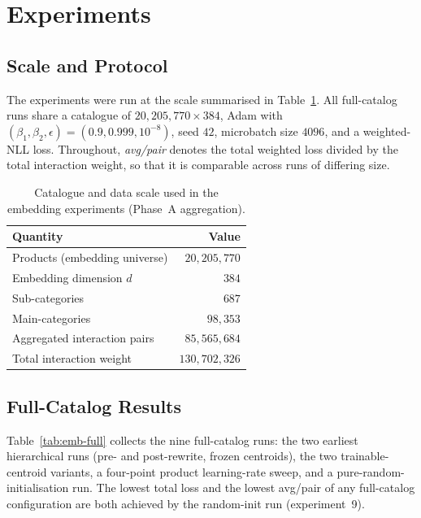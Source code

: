 \section{Experiments}
\label{sec:emb-experiments}

\subsection{Scale and Protocol}
The experiments were run at the scale summarised in
Table~\ref{tab:emb-scale}. All full-catalog runs share a catalogue of
$20{,}205{,}770\times 384$, Adam with $(\beta_1,\beta_2,\epsilon)=(0.9,0.999,
10^{-8})$, seed $42$, microbatch size $4096$, and a weighted-NLL loss.
Throughout, \emph{avg/pair} denotes the total weighted loss divided by the total
interaction weight, so that it is comparable across runs of differing size.

\begin{table}[ht]
  \centering
  \caption{Catalogue and data scale used in the embedding experiments
           (Phase~A aggregation).}
  \label{tab:emb-scale}
  \begin{tabular}{lr}
    \toprule
    Quantity & Value \\
    \midrule
    Products (embedding universe)     & $20{,}205{,}770$ \\
    Embedding dimension $d$           & $384$ \\
    Sub-categories                    & $687$ \\
    Main-categories                   & $98{,}353$ \\
    Aggregated interaction pairs      & $85{,}565{,}684$ \\
    Total interaction weight          & $130{,}702{,}326$ \\
    \bottomrule
  \end{tabular}
\end{table}

\subsection{Full-Catalog Results}
Table~\ref{tab:emb-full} collects the nine full-catalog runs: the two earliest
hierarchical runs (pre- and post-rewrite, frozen centroids), the two
trainable-centroid variants, a four-point product learning-rate sweep, and a
pure-random-initialisation run. The lowest total loss and the lowest avg/pair
of any full-catalog configuration are both achieved by the random-init run
(experiment~9).

